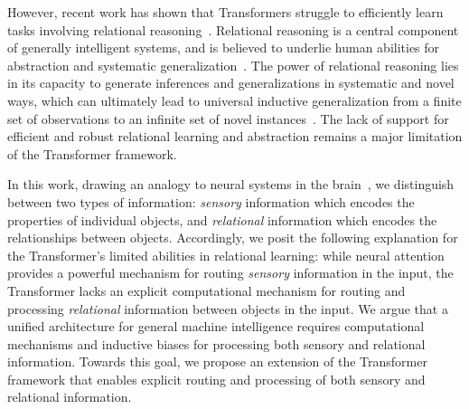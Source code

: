 
However, recent work has shown that Transformers struggle to efficiently learn tasks involving relational reasoning~\citep{lake2018generalization,barrett2018measuring,santoroSimpleNeuralNetwork2017,santoroRelationalRecurrentNeural2018,shanahanExplicitlyRelationalNeurala,webbEmergentSymbolsBinding2021,webbRelationalBottleneckInductive2024,kergNeuralArchitectureInductive2022,altabaa2024abstractors,altabaaLearningHierarchicalRelational2024}. Relational reasoning is a central component of generally intelligent systems, and is believed to underlie human abilities for abstraction and systematic generalization~\citep{snow1984topography,kemp2008discovery,holyoak2012analogy}. The power of relational reasoning lies in its capacity to generate inferences and generalizations in systematic and novel ways, which can ultimately lead to universal inductive generalization from a finite set of observations to an infinite set of novel instances~\citep{goyal2022inductive}. The lack of support for efficient and robust relational learning and abstraction remains a major limitation of the Transformer framework.

In this work, drawing an analogy to neural systems in the brain~\citep{newman1997neural}, we distinguish between two types of information: \textit{sensory} information which encodes the properties of individual objects, and \textit{relational} information which encodes the relationships between objects. Accordingly, we posit the following explanation for the Transformer's limited abilities in relational learning: while neural attention provides a powerful mechanism for routing \textit{sensory} information in the input, the Transformer lacks an explicit computational mechanism for routing and processing \textit{relational} information between objects in the input. We argue that a unified architecture for general machine intelligence requires computational mechanisms and inductive biases for processing both sensory and relational information. Towards this goal, we propose an extension of the Transformer framework that enables explicit routing and processing of both sensory and relational information.


